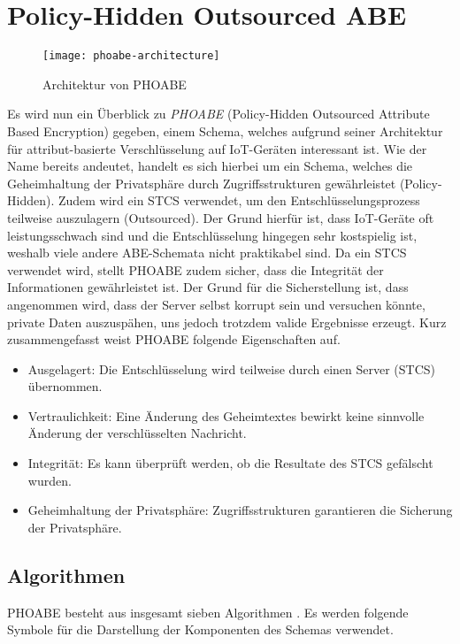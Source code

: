 \section{Policy-Hidden Outsourced ABE}

\begin{figure}
	\centering
	\texttt{[image: phoabe-architecture]}
	\caption{Architektur von PHOABE \cite{phoabe}}
\end{figure}

Es wird nun ein Überblick zu \textit{PHOABE} (Policy-Hidden Outsourced
Attribute Based Encryption) gegeben, einem Schema, welches aufgrund seiner
Architektur für attribut-basierte Verschlüsselung auf IoT-Geräten interessant
ist. Wie der Name bereits andeutet, handelt es sich hierbei um ein Schema,
welches die Geheimhaltung der Privatsphäre durch Zugriffsstrukturen
gewährleistet (Policy-Hidden). Zudem wird ein STCS verwendet, um den
Entschlüsselungsprozess teilweise auszulagern (Outsourced). Der Grund hierfür
ist, dass IoT-Geräte oft leistungsschwach sind und die Entschlüsselung
hingegen sehr kostspielig ist, weshalb viele andere ABE-Schemata nicht
praktikabel sind. Da ein STCS verwendet wird, stellt PHOABE zudem sicher, dass
die Integrität der Informationen gewährleistet ist. Der Grund für die
Sicherstellung ist, dass angenommen wird, dass der Server selbst korrupt sein
und versuchen könnte, private Daten auszuspähen, uns jedoch trotzdem valide
Ergebnisse erzeugt. Kurz zusammengefasst weist PHOABE folgende Eigenschaften
auf.

\FloatBarrier
\begin{itemize}
	\item Ausgelagert: Die Entschlüsselung wird teilweise durch einen Server
		(STCS) übernommen.
	\item Vertraulichkeit: Eine Änderung des Geheimtextes bewirkt keine
		sinnvolle Änderung der verschlüsselten Nachricht.
	\item Integrität: Es kann überprüft werden, ob die Resultate des STCS
		ge\-fälscht wurden.
	\item Geheimhaltung der Privatsphäre: Zugriffsstrukturen garantieren die
		Sicherung der Privatsphäre.
\end{itemize}

\subsection{Algorithmen}
PHOABE besteht aus insgesamt sieben Algorithmen \cite{phoabe}. Es werden
folgende Symbole für die Darstellung der Komponenten des Schemas verwendet.

